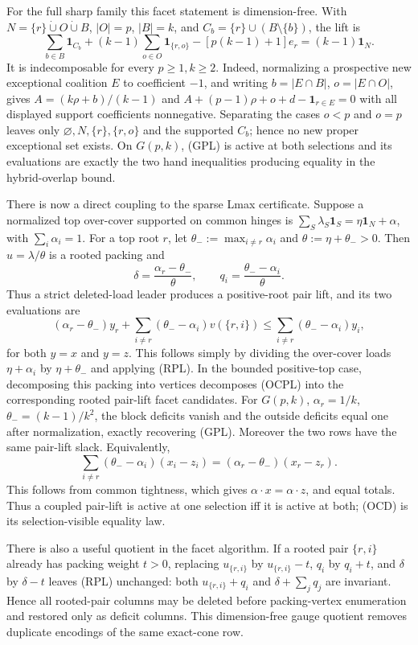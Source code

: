 \documentclass[11pt]{article}
\begin{document}
For the full sharp family this facet statement is dimension-free.  With
$N=\{r\}\mathbin{\dot\cup}O\mathbin{\dot\cup}B$,
$|O|=p$, $|B|=k$, and $C_b=\{r\}\cup(B\setminus\{b\})$, the lift is
\[
 \sum_{b\in B}\mathbf1_{C_b}
 +(k-1)\sum_{o\in O}\mathbf1_{\{r,o\}}
 -[p(k-1)+1]e_r=(k-1)\mathbf1_N.                     \tag{GPL}
\]
It is indecomposable for every $p\ge1,k\ge2$.  Indeed, normalizing a
prospective new exceptional coalition $E$ to coefficient $-1$, and writing
$b=|E\cap B|$, $o=|E\cap O|$, gives
$A=(k\rho+b)/(k-1)$ and
$A+(p-1)\rho+o+d-\mathbf1_{r\in E}=0$ with all displayed support
coefficients nonnegative.  Separating the cases $o<p$ and $o=p$ leaves only
$\varnothing,N,\{r\},\{r,o\}$ and the supported $C_b$; hence no new proper
exceptional set exists.  On $G(p,k)$, (GPL) is active at both selections and
its evaluations are exactly the two hand inequalities producing equality in
the hybrid-overlap bound.

There is now a direct coupling to the sparse Lmax certificate.  Suppose a
normalized top over-cover supported on common hinges is
$\sum_S\lambda_S\mathbf1_S=\eta\mathbf1_N+\alpha$, with
$\sum_i\alpha_i=1$.  For a top root $r$, let
$\theta_-:=\max_{i\ne r}\alpha_i$ and
$\theta:=\eta+\theta_->0$.  Then $u=\lambda/\theta$ is a rooted packing and
\[
 \delta=\frac{\alpha_r-\theta_-}{\theta},\qquad
 q_i=\frac{\theta_--\alpha_i}{\theta}.               \tag{OCP}
\]
Thus a strict deleted-load leader produces a positive-root pair lift, and
its two evaluations are
\[
 (\alpha_r-\theta_-)y_r
 +\sum_{i\ne r}(\theta_--\alpha_i)v(\{r,i\})
 \le\sum_{i\ne r}(\theta_--\alpha_i)y_i,             \tag{OCPL}
\]
for both $y=x$ and $y=z$.  This follows simply by dividing the over-cover
loads $\eta+\alpha_i$ by $\eta+\theta_-$ and applying (RPL).  In the bounded
positive-top case, decomposing this packing into vertices decomposes (OCPL)
into the corresponding rooted pair-lift facet candidates.  For $G(p,k)$,
$\alpha_r=1/k$, $\theta_-=(k-1)/k^2$, the block deficits vanish and the
outside deficits equal one after normalization, exactly recovering (GPL).
Moreover the two rows have the same pair-lift slack.  Equivalently,
\[
 \sum_{i\ne r}(\theta_--\alpha_i)(x_i-z_i)
 =(\alpha_r-\theta_-)(x_r-z_r).                      \tag{OCD}
\]
This follows from common tightness, which gives $\alpha\cdot x=\alpha\cdot z$,
and equal totals.  Thus a coupled pair-lift is active at one selection iff it
is active at both; (OCD) is its selection-visible equality law.

There is also a useful quotient in the facet algorithm.  If a rooted pair
$\{r,i\}$ already has packing weight $t>0$, replacing
$u_{\{r,i\}}$ by $u_{\{r,i\}}-t$, $q_i$ by $q_i+t$, and $\delta$ by
$\delta-t$ leaves (RPL) unchanged: both $u_{\{r,i\}}+q_i$ and
$\delta+\sum_jq_j$ are invariant.  Hence all rooted-pair columns may be
deleted before packing-vertex enumeration and restored only as deficit
columns.  This dimension-free gauge quotient removes duplicate encodings of
the same exact-cone row.
\end{document}
